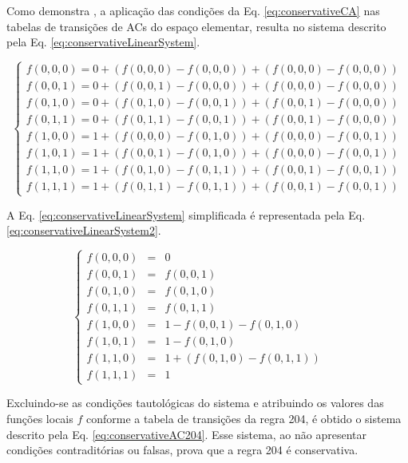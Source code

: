 Como demonstra , a aplicação das condições da Eq. \eqref{eq:conservativeCA} nas tabelas de transições de ACs do espaço elementar, resulta no sistema descrito pela Eq. \eqref{eq:conservativeLinearSystem}.

\begin{equation}
\left\{\begin{matrix}
 f(0,0,0) = 0 + (f(0,0,0) - f(0,0,0)) + (f(0,0,0) - f(0,0,0))\\ 
 f(0,0,1) = 0 + (f(0,0,1) - f(0,0,0)) + (f(0,0,0) - f(0,0,0))\\ 
 f(0,1,0) = 0 + (f(0,1,0) - f(0,0,1)) + (f(0,0,1) - f(0,0,0))\\ 
 f(0,1,1) = 0 + (f(0,1,1) - f(0,0,1)) + (f(0,0,1) - f(0,0,0))\\ 
 f(1,0,0) = 1 + (f(0,0,0) - f(0,1,0)) + (f(0,0,0) - f(0,0,1))\\ 
 f(1,0,1) = 1 + (f(0,0,1) - f(0,1,0)) + (f(0,0,0) - f(0,0,1))\\ 
 f(1,1,0) = 1 + (f(0,1,0) - f(0,1,1)) + (f(0,0,1) - f(0,0,1))\\ 
 f(1,1,1) = 1 + (f(0,1,1) - f(0,1,1)) + (f(0,0,1) - f(0,0,1))
\end{matrix}\right.
\label{eq:conservativeLinearSystem}
\end{equation}

A Eq. \eqref{eq:conservativeLinearSystem} simplificada é representada pela Eq. \eqref{eq:conservativeLinearSystem2}.

\begin{equation}
\left\{\begin{matrix}
 f(0,0,0) & = & 0 		& &\\ 
 f(0,0,1) & = & f(0,0,1)& & \\ 
 f(0,1,0) & = & f(0,1,0)& & \\ 
 f(0,1,1) & = & f(0,1,1)& & \\ 
 f(1,0,0) & = & 1 - f(0,0,1) - f(0,1,0) \\ 
 f(1,0,1) & = & 1 - f(0,1,0) \\ 
 f(1,1,0) & = & 1 + (f(0,1,0) - f(0,1,1))\\ 
 f(1,1,1) & = & 1 & &
\end{matrix}\right.
\label{eq:conservativeLinearSystem2}
\end{equation}

Excluindo-se as condições tautológicas do sistema e atribuindo os valores das funções locais $f$ conforme a tabela de transições da regra 204, é obtido o sistema descrito pela Eq. \eqref{eq:conservativeAC204}. Esse sistema, ao não apresentar condições contraditórias ou falsas, prova que a regra 204 é conservativa.


